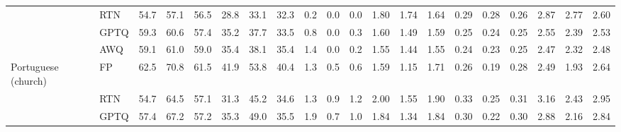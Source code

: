 \begin{landscape}
\begin{longtable}{llrrrrrrrrrrrrrrrrrr}
 & RTN & \cellcolor{loss!20}54.7 & \cellcolor{loss!15}57.1 & \cellcolor{loss!15}56.5 & \cellcolor{loss!47}28.8 & \cellcolor{loss!34}33.1 & \cellcolor{loss!33}32.3 & 0.2 & 0.0 & 0.0 & \cellcolor{loss!4}1.80 & \cellcolor{loss!4}1.74 & \cellcolor{loss!2}1.64 & \cellcolor{loss!5}0.29 & \cellcolor{loss!6}0.28 & \cellcolor{loss!2}0.26 & \cellcolor{loss!0}2.87 & \cellcolor{loss!0}2.77 & \cellcolor{loss!0}2.60 \\
 & GPTQ & \cellcolor{loss!11}59.3 & \cellcolor{loss!8}60.6 & \cellcolor{loss!13}57.4 & \cellcolor{loss!24}35.2 & \cellcolor{loss!17}37.7 & \cellcolor{loss!29}33.5 & \cellcolor{loss!0}0.8 & 0.0 & \cellcolor{loss!0}0.3 & \cellcolor{loss!2}1.60 & \cellcolor{loss!2}1.49 & \cellcolor{loss!1}1.59 & \cellcolor{loss!2}0.25 & \cellcolor{loss!3}0.24 & \cellcolor{loss!2}0.25 & \cellcolor{loss!0}2.55 & \cellcolor{loss!0}2.39 & \cellcolor{loss!0}2.53 \\
 & AWQ & \cellcolor{loss!11}59.1 & \cellcolor{loss!7}61.0 & \cellcolor{loss!10}59.0 & \cellcolor{loss!24}35.4 & \cellcolor{loss!16}38.1 & \cellcolor{loss!22}35.4 & \cellcolor{loss!1}1.4 & \cellcolor{loss!0}0.0 & \cellcolor{loss!0}0.2 & \cellcolor{loss!1}1.55 & \cellcolor{loss!1}1.44 & \cellcolor{loss!1}1.55 & \cellcolor{loss!2}0.24 & \cellcolor{loss!2}0.23 & \cellcolor{loss!1}0.25 & \cellcolor{loss!0}2.47 & \cellcolor{loss!0}2.32 & \cellcolor{loss!0}2.48 \\
\midrule
Portuguese (church) & FP & 62.5 & 70.8 & 61.5 & 41.9 & 53.8 & 40.4 & 1.3 & 0.5 & 0.6 & 1.59 & 1.15 & 1.71 & 0.26 & 0.19 & 0.28 & 2.49 & 1.93 & 2.64 \\
 & RTN & \cellcolor{loss!16}54.7 & \cellcolor{loss!13}64.5 & \cellcolor{loss!9}57.1 & \cellcolor{loss!39}31.3 & \cellcolor{loss!31}45.2 & \cellcolor{loss!21}34.6 & 1.3 & \cellcolor{loss!0}0.9 & \cellcolor{loss!0}1.2 & \cellcolor{loss!4}2.00 & \cellcolor{loss!3}1.55 & \cellcolor{loss!2}1.90 & \cellcolor{loss!5}0.33 & \cellcolor{loss!4}0.25 & \cellcolor{loss!2}0.31 & \cellcolor{loss!0}3.16 & \cellcolor{loss!0}2.43 & \cellcolor{loss!0}2.95 \\
 & GPTQ & \cellcolor{loss!11}57.4 & \cellcolor{loss!8}67.2 & \cellcolor{loss!9}57.2 & \cellcolor{loss!24}35.3 & \cellcolor{loss!18}49.0 & \cellcolor{loss!18}35.5 & \cellcolor{loss!0}1.9 & \cellcolor{loss!0}0.7 & \cellcolor{loss!0}1.0 & \cellcolor{loss!2}1.84 & \cellcolor{loss!2}1.34 & \cellcolor{loss!1}1.84 & \cellcolor{loss!3}0.30 & \cellcolor{loss!2}0.22 & \cellcolor{loss!1}0.30 & \cellcolor{loss!0}2.88 & \cellcolor{loss!0}2.16 & \cellcolor{loss!0}2.84 \\

\end{longtable}
\end{landscape}
